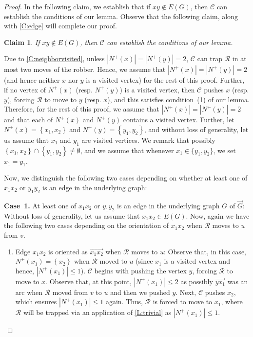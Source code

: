 \documentclass[a4paper,12pt]{amsart}
\newtheorem{claim}[theorem]{Claim}
\newcommand{\set}[1]{\left\{#1\right\}}
\newcommand{\R}{\mathcal{R}}
\newcommand{\C}{\mathcal{C}}
\newenvironment{proofofclaim}{%
  \renewcommand{\proofname}{Proof of Claim}\proof}{\endproof}
\let\leq\leqslant
\begin{document}
\begin{proof}
    In the following claim, we establish that if $xy \notin E(G)$, then $\C$ can establish the conditions of our lemma. Observe that the following claim, along with \cref{C:edge} will complete our proof.
    \begin{claim}\label{C:nonEdge}
        If $xy\notin E(G)$, then $\C$ can establish the conditions of our lemma.
    \end{claim}
    \begin{proofofclaim}
        Due to \cref{C:neighborvisited}, unless $|N^+(x)| =|N^+(y)| = 2$, $\C$ can trap $\R$ in at most two moves of the robber. Hence, we assume that $|N^+(x)| =|N^+(y)| = 2$ (and hence neither $x$ nor $y$ is a visited vertex) for the rest of this proof. Further, if no vertex of $N^+(x)$ (resp. $N^+(y)$) is a visited vertex, then $\C$ pushes $x$ (resp. $y$), forcing $\R$ to move to $y$ (resp. $x$), and this satisfies condition~(1) of our lemma. Therefore, for the rest of this proof, we assume that $|N^+(x)| =|N^+(y)| = 2$ and that each of $N^+(x)$ and $N^+(y)$ contains a visited vertex. Further, let $N^+(x) = \set{x_1,x_2}$ and $N^+(y)= \set{y_1,y_2}$, and without loss of generality, let us assume that $x_1$ and $y_1$ are visited vertices.  We remark that possibly $\set{x_1,x_2} \cap \set{y_1,y_2} \neq \emptyset$, and we assume that whenever $x_1\in \{y_1,y_2\}$, we set $x_1=y_1$.

        Now, we distinguish the following two cases depending on whether at least one of $x_1x_2$ or $y_1y_2$ is an edge in the underlying graph:

        \medskip
        \noindent\textbf{Case~1.} At least one of $x_1x_2$ or $y_1y_2$ is an edge in the underlying graph $G$ of $\overrightarrow{G}$: Without loss of generality, let us assume that $x_1x_2 \in E(G)$. Now, again we have the following two cases depending on the orientation of $x_1x_2$ when $\R$ moves to $u$ from $v$. 
        \begin{enumerate}
            \item Edge $x_1x_2$ is oriented as $\overrightarrow{x_1x_2}$ when $\R$ moves to $u$: %
            Observe that, in this case, $N^+(x_1) = \set{x_2}$ when $\R$ moved to $u$ (since $x_1$ is a visited vertex and hence, $|N^+(x_1)| \leq 1$). $\C$ begins with pushing the vertex $y$, forcing $\R$ to move to $x$. Observe that, at this point, $|N^+(x_1)| \leq 2$ as possibly $\overrightarrow{yx_1}$ was an arc when $\R$ moved from $v$ to $u$ and then we pushed $y$.  Next, $\C$ pushes $x_2$, which ensures $|N^+(x_1)| \leq 1$ again. Thus,  $\R$ is forced to move to $x_1$, where $\R$ will be trapped via an application of \cref{L:trivial} as $|N^+(x_1)| \leq 1$. 


\end{enumerate}
\end{proofofclaim}
\end{proof}
\end{document}
